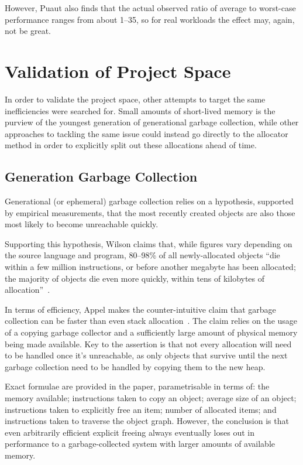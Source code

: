 However, Puaut also finds that the actual observed ratio of average to worst-case performance ranges from about 1–35, so for real workloads the effect may, again, not be great.

\section{Validation of Project Space}

In order to validate the project space, other attempts to target the same inefficiencies were searched for. Small amounts of short-lived memory is the purview of the youngest generation of generational garbage collection, while other approaches to tackling the same issue could instead go directly to the allocator method in order to explicitly split out these allocations ahead of time.

\subsection{Generation Garbage Collection}

Generational (or ephemeral) garbage collection relies on a hypothesis, supported by empirical measurements, that the most recently created objects are also those most likely to become unreachable quickly.

Supporting this hypothesis, Wilson claims that, while figures vary depending on the source language and program, 80–98\% of all newly-allocated objects ``die within a few million instructions, or before another megabyte has been allocated; the majority of objects die even more quickly, within tens of kilobytes of allocation''~\cite{uniprocessorgc}.

In terms of efficiency, Appel makes the counter-intuitive claim that garbage collection can be faster than even stack allocation~\cite{stackvgc}. The claim relies on the usage of a copying garbage collector and a sufficiently large amount of physical memory being made available. Key to the assertion is that not every allocation will need to be handled once it's unreachable, as only objects that survive until the next garbage collection need to be handled by copying them to the new heap.

Exact formulae are provided in the paper, parametrisable in terms of: the memory available; instructions taken to copy an object; average size of an object; instructions taken to explicitly free an item; number of allocated items; and instructions taken to traverse the object graph. However, the conclusion is that even arbitrarily efficient explicit freeing always eventually loses out in performance to a garbage-collected system with larger amounts of available memory.


